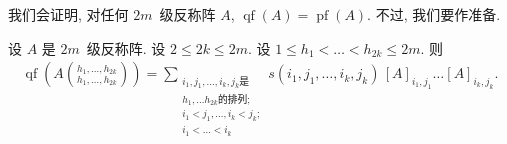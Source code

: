 \documentclass[../libro]{subfiles}
\begin{document}
我们会证明, 对任何 \(2m\)~级反称阵 \(A\),
\(\operatorname{qf} {(A)} = \operatorname{pf} {(A)}\).
不过, 我们要作准备.

\begin{theorem}
    设 \(A\) 是 \(2m\)~级反称阵.
    设 \(2 \leq 2k \leq 2m\).
    设 \(1 \leq h_1 < \dots < h_{2k} \leq 2m\).
    则
    \begin{align*}
        \operatorname{qf} {\left(
            A\binom{h_1,\dots,h_{2k}}{h_1,\dots,h_{2k}}
            \right)}
        = \sum_{\substack{
        i_1, j_1, \dots, i_k, j_k \text{是} \\
        h_1, \dots h_{2k} \text{的排列};      \\
        i_1 < j_1, \dots, i_k < j_k;       \\
                i_1 < \dots < i_k
            }}
        {s(i_1, j_1, \dots, i_k, j_k)\,
            [A]_{i_1,j_1} \dots [A]_{i_k,j_k}}.
    \end{align*}
\end{theorem}
\end{document}
